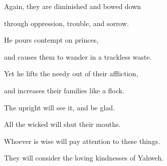 {\par }{\Q {}Again, they are diminished and bowed down
\par }{\QB through oppression, trouble, and sorrow.
\par }{\Q {}He pours contempt on princes,
\par }{\QB and causes them to wander in a trackless waste.
\par }{\Q {}Yet he lifts the needy out of their affliction,
\par }{\QB and increases their families like a flock.
\par }{\Q {}The upright will see it, and be glad.
\par }{\QB All the wicked will shut their mouths.
\par }{\Q {}Whoever is wise will pay attention to these things.
\par }{\QB They will consider the loving kindnesses of Yahweh.

}
